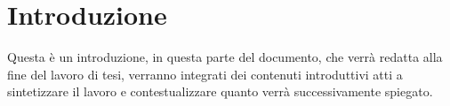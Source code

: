 \chapter{Introduzione}

Questa è un introduzione, in questa parte del documento, che verrà redatta alla
fine del lavoro di tesi, verranno integrati dei contenuti introduttivi atti a
sintetizzare il lavoro e contestualizzare quanto verrà successivamente spiegato.
